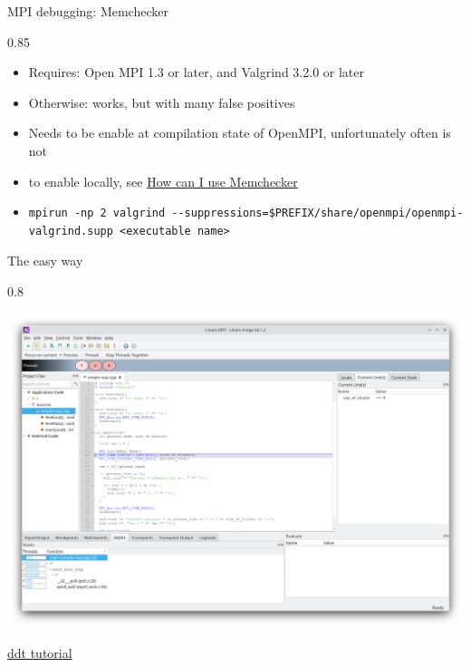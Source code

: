 \documentclass[aspectratio=1610]{beamer}
\newenvironment{centeredblock}[2][0.8\textwidth]
{ %
	\begin{center}
		\begin{varwidth}{#1} %
			\begin{block}{#2}
				\centering
			}
			{ %
			\end{block}
		\end{varwidth}
	\end{center}
}
\begin{document}
	\begin{frame}[fragile]{MPI debugging: Memchecker}
		\begin{centeredblock}[0.85 \textwidth]{}
			\begin{itemize}
				\item Requires: Open MPI 1.3 or later, and Valgrind 3.2.0 or later
				\item Otherwise: works, but with many false positives
				\item Needs to be enable at compilation state of OpenMPI, unfortunately often is not
				\item to enable locally, see \href{https://www.open-mpi.org/faq/?category=debugging#memchecker}{How can I use Memchecker}
				\item \begin{verbatim}
mpirun -np 2 valgrind --suppressions=$PREFIX/share/openmpi/openmpi-valgrind.supp <executable name>
				\end{verbatim}
			\end{itemize}
		\end{centeredblock}
	\end{frame}
	
	\begin{frame}[fragile]{The easy way}
		\begin{centeredblock}{}
			\centering					
			\includegraphics[width=0.9\linewidth]{figures/ddt}
			
			
			\href{https://youtu.be/Q8HwLg22BpY?t=1006}{ddt tutorial}
		\end{centeredblock}
	\end{frame}
	
\end{document}
